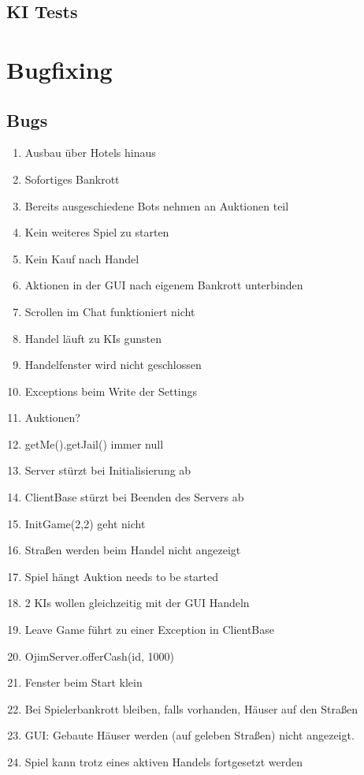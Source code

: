 \documentclass[a4paper,10pt]{article}
\begin{document}
\subsection{KI Tests}

\section{Bugfixing}
\subsection{Bugs}
\begin{enumerate}
\item Ausbau über Hotels hinaus
\item Sofortiges Bankrott
\item Bereits ausgeschiedene Bots nehmen an Auktionen teil
\item Kein weiteres Spiel zu starten
\item Kein Kauf nach Handel
\item Aktionen in der GUI nach eigenem Bankrott unterbinden
\item Scrollen im Chat funktioniert nicht
\item Handel läuft zu KIs gunsten
\item Handelfenster wird nicht geschlossen
\item Exceptions beim Write der Settings
\item Auktionen?
\item getMe().getJail() immer null
\item Server stürzt bei Initialisierung ab
\item ClientBase stürzt bei Beenden des Servers ab
\item InitGame(2,2) geht nicht
\item Straßen werden beim Handel nicht angezeigt
\item Spiel hängt Auktion needs to be started
\item 2 KIs wollen gleichzeitig mit der GUI Handeln
\item Leave Game führt zu einer Exception in ClientBase
\item OjimServer.offerCash(id, 1000)
\item Fenster beim Start klein
\item Bei Spielerbankrott bleiben, falls vorhanden, Häuser auf den Straßen
\item GUI: Gebaute Häuser werden (auf geleben Straßen) nicht angezeigt.
\item Spiel kann trotz eines aktiven Handels fortgesetzt werden
\end{enumerate}
\end{document}
